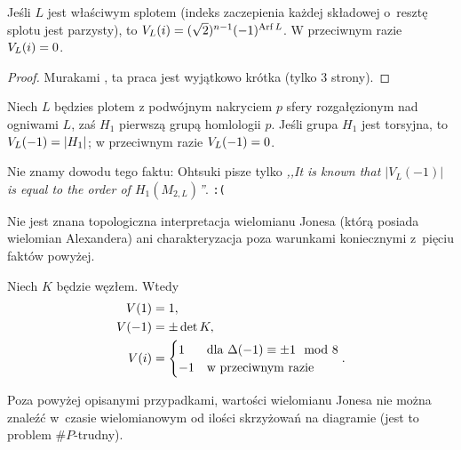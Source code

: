 \begin{proposition}
    Jeśli $L$ jest właściwym splotem (indeks zaczepienia każdej składowej o~resztę splotu jest parzysty), to $V_L(i) = (\sqrt 2)^{n-1}(-1)^{\operatorname{Arf} L}$.
    W przeciwnym razie $V_L(i) = 0$.
\end{proposition}

\begin{proof}
%
    Murakami \cite{murakami1986}, ta praca jest wyjątkowo krótka (tylko 3 strony).
\end{proof}

\begin{proposition}
    Niech $L$ będzies plotem z podwójnym nakryciem $p$ sfery rozgałęzionym nad ogniwami $L$, zaś $H_1$ pierwszą grupą homlologii $p$.
    Jeśli grupa $H_1$ jest torsyjna, to $V_L(-1) = |H_1|$; w przeciwnym razie $V_L(-1) = 0$.
\end{proposition}

Nie znamy dowodu tego faktu: Ohtsuki \cite[s. 383]{ohtsuki2002} pisze tylko \emph{,,It is known that $|V_L(-1)|$ is equal to the order of $H_1(M_{2,L})$''}. \hfill \texttt{:(}


Nie jest znana topologiczna interpretacja wielomianu Jonesa (którą posiada wielomian Alexandera) ani charakteryzacja poza warunkami koniecznymi z~pięciu faktów powyżej.

\begin{corollary}
    Niech $K$ będzie węzłem.
    Wtedy
    \begin{align}
        V(1) & = 1, \\
        V(-1) & = \pm \det K, \\
        V(i) & = \begin{cases}
            1 & \text{dla } \Delta(-1) \equiv \pm 1 \mod 8 \\
            -1 & \text{w przeciwnym razie}
        \end{cases}.
    \end{align}
\end{corollary}

Poza powyżej opisanymi przypadkami, wartości wielomianu Jonesa nie można znaleźć w~czasie wielomianowym od ilości skrzyżowań na diagramie (jest to problem $\#P$-trudny).




